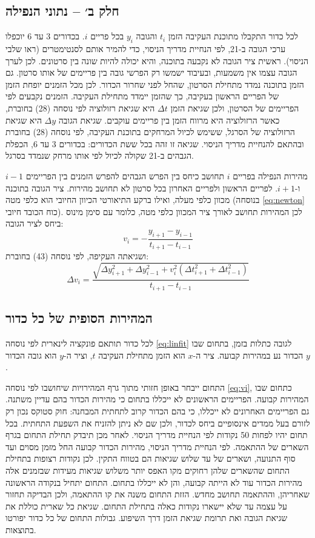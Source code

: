 \documentclass[10pt,a4paper]{article}
\begin{document}
\subsection*{חלק ב׳ -- נתוני הנפילה}
לכל כדור התקבלו מתוכנת העקיבה הזמן $t_i$ והגובה $y_i$ בכל פריים $i$. בכדורים 3 עד 6 יוכפלו ערכי הגובה ב-21, לפי הנחיית מדריך הניסוי, כדי להמיר אותם לסנטימטרים (ראו שלבי הניסוי). ראשית ציר הגובה לא נקבעה בתוכנה, והיא יכולה להיות שונה בין סרטונים. לכן לערך הגובה עצמו אין משמעות, ובעיבוד ישמשו רק הפרשי גובה בין פריימים של אותו סרטון. גם הזמן בתוכנה נמדד מתחילת הסרטון, שהחל לפני שחרור הכדור. לכן מכל הזמנים יופחת הזמן של הפריים הראשון בעקיבה, כך שהזמן יימדד מתחילת העקיבה.
הזמנים נקבעים לפי הפריימים של הסרטון, ולכן שגיאת הזמן $\Delta t$ היא שגיאת רזולוציה לפי נוסחה (28) בחוברת, כאשר הרזולוציה היא מרווח הזמן בין פריימים עוקבים.
שגיאת הגובה $\Delta y$ היא שגיאת הרזולוציה של הסרגל, ששימש לכיול המרחקים בתוכנת העקיבה, לפי נוסחה (28) בחוברת ובהתאם להנחיית מדריך הניסוי. שגיאה זו זהה בכל ששת הכדורים: בכדורים 3 עד 6, הכפלת הגבהים ב-21 שקולה לכיול לפי אותו מרחק שנמדד בסרגל.

מהירות הנפילה בפריים $i$ תחושב כיחס בין הפרש הגבהים להפרש הזמנים בין הפריימים $i-1$ ו-$i+1$. לפריים הראשון ולפריים האחרון בכל סרטון לא תחושב מהירות. ציר הגובה בתוכנה מכוון כלפי מעלה, ואילו ברקע התיאורטי הכיוון החיובי הוא כלפי מטה (בנוסחה \eqref{eq:newton} כוח הכובד חיובי). לכן המהירות תחושב לאורך ציר המכוון כלפי מטה, כלומר עם סימן מינוס ביחס לציר הגובה:
\begin{equation}\label{eq:vi}
v_i = -\frac{y_{i+1}-y_{i-1}}{t_{i+1}-t_{i-1}}
\end{equation}
ושגיאתה העקיפה, לפי נוסחה (43) בחוברת:
\begin{equation}\label{eq:dvi}
\Delta v_i = \frac{\sqrt{\Delta y_{i+1}^2+\Delta y_{i-1}^2 + v_i^2\left(\Delta t_{i+1}^2+\Delta t_{i-1}^2\right)}}{t_{i+1}-t_{i-1}}
\end{equation}

\subsection*{המהירות הסופית של כל כדור}
לכל כדור תותאם פונקציה לינארית לפי נוסחה \eqref{eq:linfit} לגובה כתלות בזמן, בתחום שבו הכדור נע במהירות קבועה. ציר ה-$x$ הוא הזמן מתחילת העקיבה $t$, וציר ה-$y$ הוא גובה הכדור $y$.

התחום ייבחר באופן חזותי מתוך גרף המהירויות שיחושבו לפי נוסחה \eqref{eq:vi}, כתחום שבו המהירות קבועה. הפריימים הראשונים לא ייכללו בתחום כי מהירות הכדור בהם עדיין משתנה. גם הפריימים האחרונים לא ייכללו, כי בהם הכדור קרוב לתחתית המבחנה: חוק סטוקס נכון רק לזורם בעל ממדים אינסופיים ביחס לכדור, ולכן שם לא ניתן להזניח את השפעת התחתית. בכל תחום יהיו לפחות 50 נקודות לפי הנחיית מדריך הניסוי. לאחר מכן תיבדק תחילת התחום בגרף השארים של ההתאמה. לפי הנחיית מדריך הניסוי, מהירות הכדור קבועה החל מזמן מסוים ועד סוף התנועה, ושארים של עד שלוש שגיאות הם בטווח התקין. לכן נקודות רצופות בתחילת התחום שהשארים שלהן רחוקים מקו האפס יותר משלוש שגיאות מעידות שבזמנים אלה מהירות הכדור עוד לא הייתה קבועה, והן לא ייכללו בתחום. התחום יתחיל בנקודה הראשונה שאחריהן, וההתאמה תחושב מחדש. הזזת התחום משנה את קו ההתאמה, ולכן הבדיקה תחזור על עצמה עד שלא יישארו נקודות כאלה בתחילת התחום. שגיאת כל שארית כוללת את שגיאת הגובה ואת תרומת שגיאת הזמן דרך השיפוע. גבולות התחום של כל כדור יפורטו בתוצאות.
\end{document}
